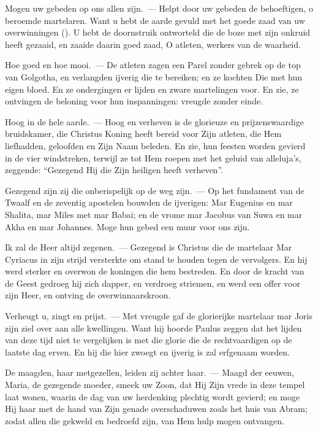 \documentclass[12pt,twoside,a5paper]{article}
\begin{document}
\begin{halfparskip}
  Mogen uw gebeden op ons allen zijn.~--- Helpt door uw gebeden de behoeftigen, o beroemde martelaren. Want u hebt de aarde gevuld met het goede zaad van uw overwinningen (). U hebt de doornstruik ontworteld die de boze met zijn onkruid heeft gezaaid, en zaaide daarin goed zaad, O atleten, werkers van de waarheid.

  Hoe goed en hoe mooi.~--- De atleten zagen een Parel zonder gebrek op de top van Golgotha, en verlangden ijverig die te bereiken; en ze kochten Die met hun eigen bloed. En ze ondergingen er lijden en zware martelingen voor. En zie, ze ontvingen de beloning voor hun inspanningen: vreugde zonder einde.

  Hoog in de hele aarde.~--- Hoog en verheven is de glorieuze en prijzenswaardige bruidskamer, die Christus Koning heeft bereid voor Zijn atleten, die Hem liefhadden, geloofden en Zijn Naam beleden. En zie, hun feesten worden gevierd in de vier windstreken, terwijl ze tot Hem roepen met het geluid van alleluja's, zeggende: ``Gezegend Hij die Zijn heiligen heeft verheven''.

  Gezegend zijn zij die onberispelijk op de weg zijn.~--- Op het fundament van de Twaalf en de zeventig apostelen bouwden de ijverigen: Mar Eugenius en mar Shalita, mar Miles met mar Babai; en de vrome mar Jacobus van Suwa en mar Akha en mar Johannes. Moge hun gebed een muur voor ons zijn.

  Ik zal de Heer altijd zegenen.~--- Gezegend is Christus die de martelaar Mar Cyriacus in zijn strijd versterkte om stand te houden tegen de vervolgers. En hij werd sterker en overwon de koningen die hem bestreden. En door de kracht van de Geest gedroeg hij zich dapper, en verdroeg striemen, en werd een offer voor zijn Heer, en ontving de overwinnaarskroon.

  Verheugt u, zingt en prijst.~--- Met vreugde gaf de glorierijke martelaar mar Joris zijn ziel over aan alle kwellingen. Want hij hoorde Paulus zeggen dat het lijden van deze tijd niet te vergelijken is met die glorie die de rechtvaardigen op de laatste dag erven. En hij die hier zwoegt en ijverig is zal erfgenaam worden.

  De maagden, haar metgezellen, leiden zij achter haar.~--- Maagd der eeuwen, Maria, de gezegende moeder, smeek uw Zoon, dat Hij Zijn vrede in deze tempel laat wonen, waarin de dag van uw herdenking plechtig wordt gevierd; en moge Hij haar met de hand van Zijn genade overschaduwen zoals het huis van Abram; zodat allen die gekweld en bedroefd zijn, van Hem hulp mogen ontvangen.


\end{halfparskip}
\end{document}

